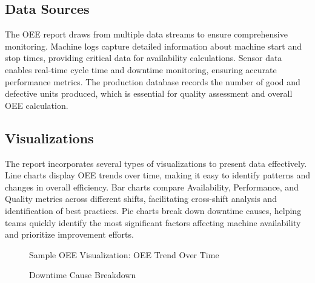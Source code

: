 \documentclass[a4paper,12pt]{article}
\begin{document}
\subsection{Data Sources}

The OEE report draws from multiple data streams to ensure comprehensive monitoring. Machine logs capture detailed information about machine start and stop times, providing critical data for availability calculations. Sensor data enables real-time cycle time and downtime monitoring, ensuring accurate performance metrics. The production database records the number of good and defective units produced, which is essential for quality assessment and overall OEE calculation.

\subsection{Visualizations}

The report incorporates several types of visualizations to present data effectively. Line charts display OEE trends over time, making it easy to identify patterns and changes in overall efficiency. Bar charts compare Availability, Performance, and Quality metrics across different shifts, facilitating cross-shift analysis and identification of best practices. Pie charts break down downtime causes, helping teams quickly identify the most significant factors affecting machine availability and prioritize improvement efforts.

\begin{figure}[H]
    \centering
    \caption{Sample OEE Visualization: OEE Trend Over Time}
\end{figure}

\begin{figure}[H]
    \centering
    \caption{Downtime Cause Breakdown}
\end{figure}
\end{document}
